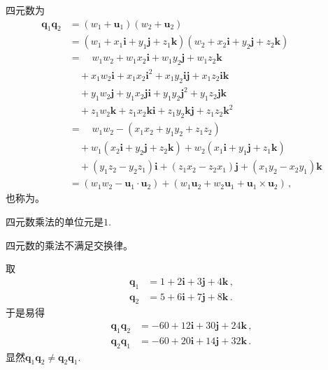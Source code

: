 \begin{definition}
    四元数为
    \begin{align}
        {\bm q}_1{\bm q}_2 & =(w_1+{\bm u}_1)(w_2+{\bm u}_2)\nonumber                                                                      \\
                           & =(w_1+x_1\mathbf{i}+y_1\mathbf{j}+z_1\mathbf{k})(w_2+x_2\mathbf{i}+y_2\mathbf{j}+z_2\mathbf{k})\nonumber      \\
                           & =\quad w_1w_2+w_1x_2\mathbf{i}+w_1y_2\mathbf{j}+w_1z_2\mathbf{k}\nonumber                                     \\
                           & \quad +x_1w_2\mathbf{i}+x_1x_2\mathbf{i}^2+x_1y_2\mathbf{i}\mathbf{j}+x_1z_2\mathbf{i}\mathbf{k}\nonumber     \\
                           & \quad +y_1w_2\mathbf{j}+y_1x_2\mathbf{j}\mathbf{i}+y_1y_2\mathbf{j}^2+y_1z_2\mathbf{j}\mathbf{k}\nonumber     \\
                           & \quad +z_1w_2\mathbf{k}+z_1x_2\mathbf{k}\mathbf{i}+z_1y_2\mathbf{k}\mathbf{j}+z_1z_2\mathbf{k}^2\nonumber     \\
                           & =\quad w_1w_2-(x_1x_2+y_1y_2+z_1z_2)\nonumber                                                                 \\
                           & \quad +w_1(x_2\mathbf{i}+y_2\mathbf{j}+z_2\mathbf{k})+w_2(x_1\mathbf{i}+y_1\mathbf{j}+z_1\mathbf{k})\nonumber \\
                           & \quad +(y_1z_2-y_2z_1)\mathbf{i}+(z_1x_2-z_2x_1)\mathbf{j}+(x_1y_2-x_2y_1)\mathbf{k}\nonumber                 \\
                           & =(w_1w_2-{\bm u}_1\cdot{\bm u}_2)+(w_1{\bm u}_2+w_2{\bm u}_1+{\bm u}_1\times{\bm u}_2)\, ,
    \end{align}
    也称为。
\end{definition}
\begin{proposition}
    四元数乘法的单位元是$1$.
\end{proposition}
\begin{corollary}
    四元数的乘法不满足交换律。
\end{corollary}
\begin{example}
    取
    \begin{align}
        {\bm q}_1 & =1+2\mathbf{i}+3\mathbf{j}+4\mathbf{k}\, , \\
        {\bm q}_2 & =5+6\mathbf{i}+7\mathbf{j}+8\mathbf{k}\, .
    \end{align}
    于是易得
    \begin{align}
        {\bm q}_1{\bm q}_2 & =-60+12\mathbf{i}+30\mathbf{j}+24\mathbf{k}\, , \\
        {\bm q}_2{\bm q}_1 & =-60+20\mathbf{i}+14\mathbf{j}+32\mathbf{k}\, .
    \end{align}
    显然${\bm q}_1{\bm q}_2\neq{\bm q}_2{\bm q}_1$.
\end{example}

